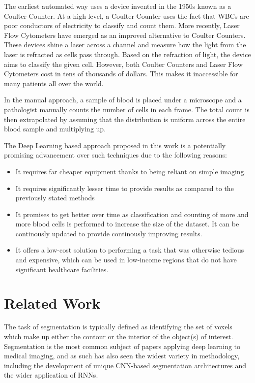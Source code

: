 \documentclass{nitk}
\begin{document}
    The earliest automated way uses a device invented in the 1950s known as a Coulter Counter. At a high level, a Coulter Counter uses the fact that WBCs are poor conductors of electricity to classify and count them. More recently, Laser Flow Cytometers have emerged as an improved alternative to Coulter Counters. These devices shine a laser across a channel and measure how the light from the laser is refracted as cells pass through. Based on the refraction of light, the device aims to classify the given cell. However, both Coulter Counters and Laser Flow Cytometers cost in tens of thousands of dollars. This makes it inaccessible for many patients all over the world. \\ \par
    
    In the manual approach, a sample of blood is placed under a microscope and a pathologist manually counts the number of cells in each frame. The total count is then extrapolated by assuming that the distribution is uniform across the entire blood sample and multiplying up. \\ \par
    
    The Deep Learning based approach proposed in this work is a potentially promising advancement over such techniques due to the following reasons:
    \begin{itemize}
        \item It requires far cheaper equipment thanks to being reliant on simple imaging.
        \item It requires significantly lesser time to provide results as compared to the previously stated methods
        \item It promises to get better over time as classification and counting of more and more blood cells is performed to increase the size of the dataset. It can be continously updated to provide continously improving results. 
        \item It offers a low-cost solution to performing a task that was otherwise tedious and expensive, which can be used in low-income regions that do not have significant healthcare facilities. 
    \end{itemize}
    
    \pagebreak 
    \section{Related Work}
    \par
    The task of segmentation is typically defined as identifying the set of voxels which make up either the contour or the interior of the object(s) of interest. Segmentation is the most common subject of papers applying deep learning to medical imaging, and as such has also seen the widest variety in methodology, including the development of unique CNN-based segmentation architectures and the wider application of RNNs. \\ \par
    
\end{document}

